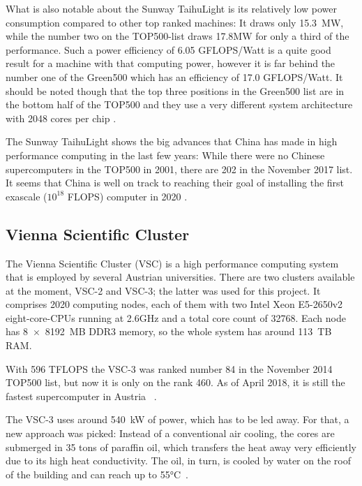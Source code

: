 What is also notable about the Sunway TaihuLight is its relatively low power consumption compared to other top ranked machines: It draws only 15.3~MW, while the number two on the TOP500-list draws 17.8MW for only a third of the performance. Such a power efficiency of 6.05 GFLOPS/Watt is a quite good result for a machine with that computing power, however it is far behind the number one of the Green500 which has an efficiency of 17.0 GFLOPS/Watt. It should be noted though that the top three positions in the Green500 list are in the bottom half of the TOP500 and they use a very different system architecture with 2048 cores per chip \cite{green500}.

The Sunway TaihuLight shows the big advances that China has made in high performance computing in the last few years: While there were no Chinese supercomputers in the TOP500 in 2001, there are 202 in the November 2017 list. It seems that China is well on track to reaching their goal of installing the first exascale ($10^{18}$ FLOPS) computer in 2020 \cite{dongarra2016report}.

\subsection{Vienna Scientific Cluster}
\label{sec:vsc3}

The Vienna Scientific Cluster (VSC) is a high performance computing system that is employed by several Austrian universities. There are two clusters available at the moment, VSC-2 and VSC-3; the latter was used for this project. It comprises 2020 computing nodes, each of them with two Intel Xeon E5-2650v2 eight-core-CPUs running at 2.6GHz and a total core count of 32768. Each node has 8~$\times$~8192~MB DDR3 memory, so the whole system has around 113~TB RAM.

With 596 TFLOPS the VSC-3 was ranked number 84 in the November 2014 TOP500 list, but now it is only on the rank 460.  As of April 2018, it is still the fastest supercomputer in Austria ~\cite{top500n_VSC3}. 

The VSC-3 uses around 540~kW of power, which has to be led away. For that, a new approach was picked: Instead of a conventional air cooling, the cores are submerged in 35 tons of paraffin oil, which transfers the heat away very efficiently due to its high heat conductivity. The oil, in turn, is cooled by water on the roof of the building and can reach up to 55°C~\cite{vsc_oil}.



